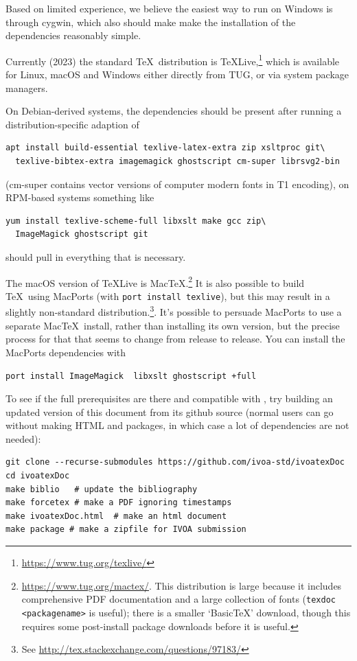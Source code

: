 \documentclass[11pt,a4paper]{ivoa}
\begin{document}
Based on limited experience, we believe the easiest way to run
\ivoatex{} on Windows is through cygwin, which also should make make the
installation of the dependencies reasonably simple.

Currently (2023) the standard \TeX\ distribution is
\TeX Live,\footnote{\url{https://www.tug.org/texlive/}} which is available
for Linux, macOS and Windows either directly from TUG, or via system
package managers.

On Debian-derived systems, the dependencies should be present after
running a distribution-specific adaption of
\begin{lstlisting}[basicstyle=\footnotesize]
apt install build-essential texlive-latex-extra zip xsltproc git\
  texlive-bibtex-extra imagemagick ghostscript cm-super librsvg2-bin
\end{lstlisting}
(cm-super contains vector versions of computer modern fonts in T1
encoding), on RPM-based systems something like
\begin{lstlisting}
yum install texlive-scheme-full libxslt make gcc zip\
  ImageMagick ghostscript git
\end{lstlisting}
should pull in everything that is necessary.

The macOS version of \TeX Live is
Mac\TeX.\footnote{\url{https://www.tug.org/mactex/}.  This
distribution is large because it includes comprehensive
PDF documentation and a large collection of fonts (\texttt{texdoc <packagename>} is
useful); there is a smaller `Basic\TeX' download, though this requires
some post-install package downloads before it is useful.}  It is also
possible to build \TeX\ using MacPorts (with \texttt{port install
  texlive}), but this may result in a slightly non-standard
distribution.\footnote{See \url{http://tex.stackexchange.com/questions/97183/}}.
It's possible to persuade MacPorts to use a separate Mac\TeX\ install,
rather than installing its own version,
but the precise process for that that seems to change from release to release.
You can install the MacPorts dependencies with
\begin{lstlisting}
port install ImageMagick  libxslt ghostscript +full
\end{lstlisting}

To see if the full prerequisites are there and compatible with \ivoatex, try
building an updated version of this document from its github source
(normal users can go without making HTML and packages, in which case a
lot of dependencies are not needed):
\begin{lstlisting}[basicstyle=\footnotesize]
git clone --recurse-submodules https://github.com/ivoa-std/ivoatexDoc
cd ivoatexDoc
make biblio   # update the bibliography
make forcetex # make a PDF ignoring timestamps
make ivoatexDoc.html  # make an html document
make package # make a zipfile for IVOA submission
\end{lstlisting}
\end{document}
